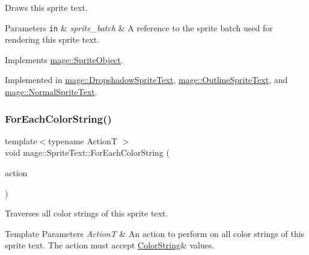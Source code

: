 Draws this sprite text.


\begin{DoxyParams}[1]{Parameters}
\mbox{\tt in}  & {\em sprite\+\_\+batch} & A reference to the sprite batch used for rendering this sprite text. \\
\hline
\end{DoxyParams}


Implements \hyperlink{classmage_1_1_sprite_object_a1c1c885fe7846f7ee1cc0b73571c2fa0}{mage\+::\+Sprite\+Object}.



Implemented in \hyperlink{classmage_1_1_dropshadow_sprite_text_af76422c9812d7dc38e9b98e587103c67}{mage\+::\+Dropshadow\+Sprite\+Text}, \hyperlink{classmage_1_1_outline_sprite_text_a524e9ad1caeeeaa32405e61d1a5e1032}{mage\+::\+Outline\+Sprite\+Text}, and \hyperlink{classmage_1_1_normal_sprite_text_ad2a1b02bea18afd6bf61b106a727a355}{mage\+::\+Normal\+Sprite\+Text}.

\hypertarget{classmage_1_1_sprite_text_ad975957b908ad3926ace75fb60ff4474}{}\label{classmage_1_1_sprite_text_ad975957b908ad3926ace75fb60ff4474} 
\subsubsection{\texorpdfstring{For\+Each\+Color\+String()}{ForEachColorString()}\hspace{0.1cm}{\footnotesize\ttfamily [1/2]}}
{\footnotesize\ttfamily template$<$typename ActionT $>$ \\
void mage\+::\+Sprite\+Text\+::\+For\+Each\+Color\+String (\begin{DoxyParamCaption}\item[{ActionT}]{action }\end{DoxyParamCaption})\hspace{0.3cm}{\ttfamily [protected]}}

Traverses all color strings of this sprite text.


\begin{DoxyTemplParams}{Template Parameters}
{\em ActionT} & An action to perform on all color strings of this sprite text. The action must accept {\ttfamily \hyperlink{structmage_1_1_color_string}{Color\+String}\&} values. \\
\hline
\end{DoxyTemplParams}
\hypertarget{classmage_1_1_sprite_text_abc70368fd800a82cbd1ec31f51d4db17}{}\label{classmage_1_1_sprite_text_abc70368fd800a82cbd1ec31f51d4db17} 
